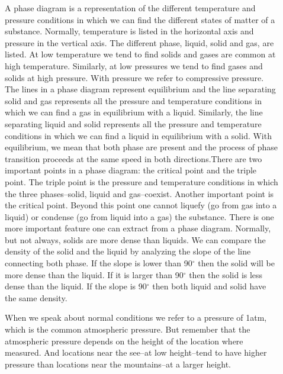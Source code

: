 \documentclass[main.tex]{subfiles}
\begin{document}
\begin{description}
\item[] 
A phase diagram is a representation of the different temperature and pressure conditions in which we can find the different states of matter of a substance. Normally, temperature is listed in the horizontal axis and pressure in the vertical axis. The different phase, liquid, solid and gas, are listed. At low temperature we tend to find solids and gases are common at high temperature. Similarly, at low pressures we tend to find gases and solids at high pressure. With pressure we refer to compressive pressure. 
The lines in a phase diagram represent equilibrium and the line separating solid and gas represents all the pressure and temperature conditions in which we can find a gas in equilibrium with a liquid. Similarly, the line separating liquid and solid represents all the pressure and temperature conditions in which we can find a liquid in equilibrium with a solid. With equilibrium, we mean that both phase are present and the process of phase transition proceeds at the same speed in both directions.There are two important points in a phase diagram: the critical point and the triple point. The triple point is the pressure and temperature conditions in which the three phases--solid, liquid and gas--coexist. Another important point is the critical point. Beyond this point one cannot liquefy (go from gas into a liquid) or condense (go from liquid into a gas) the substance. 
There is one more important feature one can extract from a phase diagram. Normally, but  not always, solids are more dense than liquids. We can compare the density of the solid and the liquid by analyzing the slope of the line connecting both phase. If the slope is lower than 90$^{\circ}$ then the solid will be more dense than the liquid. If it is larger than 90$^{\circ}$ then the solid is less dense than the liquid. If the slope is 90$^{\circ}$ then both liquid and solid have the same density.



\item[] When we speak about normal conditions we refer to a pressure of 1atm, which is the common atmospheric pressure. But remember that the atmospheric pressure depends on the height of the location where measured. And locations near the see--at low height--tend to have higher pressure than locations near the mountains--at a larger height.




\end{description}
\end{document}

